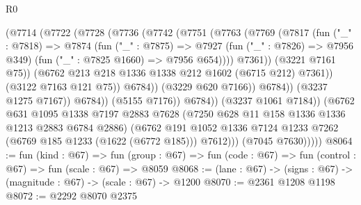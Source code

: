 \begin{lexlean}{R0}
\begin{coremodule}
                                (@7714
                                  (@7722
                                    (@7728
                                      (@7736
                                        (@7742
                                          (@7751
                                            (@7763
                                              (@7769
                                                (@7817
                                                  (fun ("_" : @7818) =>
                                                  @7874
                                                    (fun ("_" : @7875) =>
                                                    @7927
                                                      (fun ("_" : @7826) => @7956 @349)
                                                      (fun ("_" : @7825 @1660) => @7956 @654))))
                                                @7361))
                                            (@3221 @7161 @75))
                                          (@6762
                                            @213
                                            @218
                                            @1336
                                            @1338
                                            @212
                                            @1602
                                            (@6715 @212)
                                            @7361))
                                        (@3122 @7163 @121 @75))
                                      @6784))
                                  (@3229 @620 @7166))
                                @6784))
                            (@3237 @1275 @7167))
                          @6784))
                      (@5155 @7176))
                    @6784))
                (@3237 @1061 @7184))
              (@6762
                @631
                @1095
                @1338
                @7197
                @2883
                @7628
                (@7250 @628 @11 @158 @1336 @1336 @1213 @2883 @6784 @2886)
                (@6762
                  @191
                  @1052
                  @1336
                  @7124
                  @1233
                  @7262
                  (@6769 @185 @1233 (@1622 (@6772 @185)))
                  @7612)))
            (@7045 @7630)))))
@8064 := fun (kind : @67) =>
  fun (group : @67) => fun (code : @67) => fun (control : @67) => fun (scale : @67) => @8059
@8068 := (lane : @67) -> (signs : @67) -> (magnitude : @67) -> (scale : @67) -> @1200
@8070 := @2361 @1208 @1198
@8072 := @2292 @8070 @2375

\end{coremodule}
\end{lexlean}
